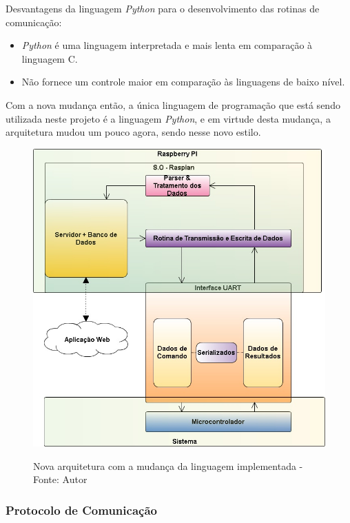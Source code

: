Desvantagens da linguagem \textit{Python} para o desenvolvimento das rotinas de comunicação:

\begin{itemize}
    \item \textit{Python} é uma linguagem interpretada e mais lenta em comparação à linguagem C.
    \item Não fornece um controle maior em comparação às linguagens de baixo nível.
\end{itemize}

Com a nova mudança então, a única linguagem de programação que está sendo utilizada neste projeto é a linguagem \textit{Python}, e em virtude 
desta mudança, a arquitetura mudou um pouco agora, sendo nesse novo estilo.

\begin{figure}[H]
\centering
\includegraphics[keepaspectratio=true,scale=0.7]{figuras/nova_arquitetura.png}
\label{fig:nova_arquitetura}
\caption{Nova arquitetura com a mudança da linguagem implementada - Fonte: Autor}
\end{figure}

\subsubsection*{\textbf{Protocolo de Comunicação}}


